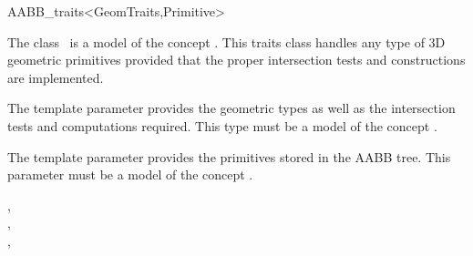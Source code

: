 \ccRefPageBegin


\begin{ccRefClass}{AABB_traits<GeomTraits,Primitive>}


\ccDefinition
  
The class \ccRefName\ is a model of the concept . This traits class handles any type of 3D geometric primitives provided that the proper intersection tests and constructions are implemented.

\ccParameters
The template parameter  provides the geometric types as well as the intersection tests and computations required. This type must be a model of the concept .

The template parameter  provides the primitives stored in the AABB tree. This parameter must be a model of the concept .


\ccTypes


\ccCreation
{}  %



\ccSeeAlso

,\\
, \\
,\\

\end{ccRefClass}

\ccRefPageEnd

